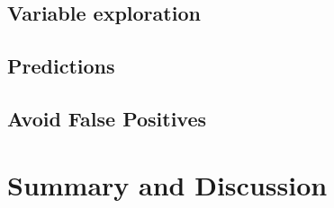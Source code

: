 \documentclass[12 pt]{scrartcl}
\begin{document}




\subsection{Variable exploration}




\subsection{Predictions}




\subsection{Avoid False Positives}


\section{Summary and Discussion}


\newpage
{}
\renewcommand\refname{Bibliography}


\end{document}
